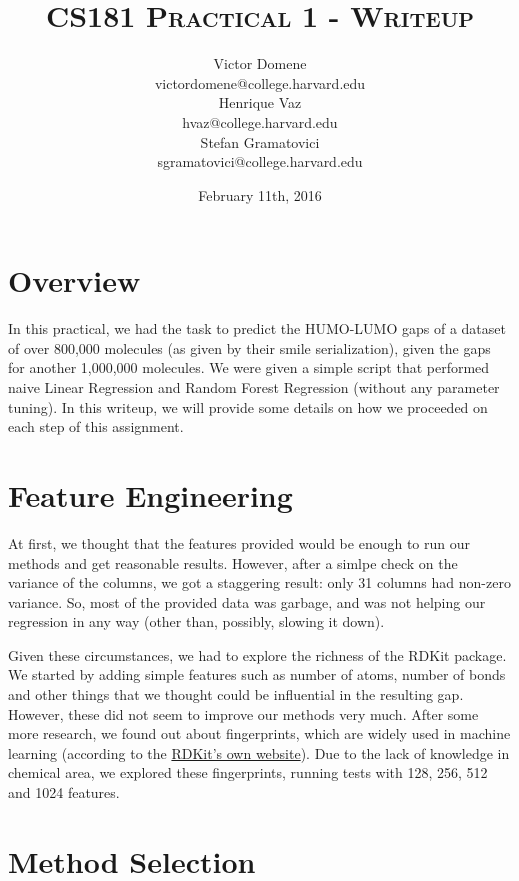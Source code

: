 \documentclass[10pt]{article}
\title{{\textsc{CS181 Practical 1 - Writeup}}}
\author{Victor Domene \\ \small{victordomene@college.harvard.edu} \\
Henrique Vaz \\ \small{hvaz@college.harvard.edu} \\
Stefan Gramatovici \\ \small{sgramatovici@college.harvard.edu}}
\date{February 11th, 2016}
\begin{document}
\hypersetup{linkcolor = black, urlcolor = blue}

\maketitle

\tableofcontents

\newpage

\section{Overview}

In this practical, we had the task to predict the HUMO-LUMO gaps of a dataset
of over 800,000 molecules (as given by their smile serialization), given the
gaps for another 1,000,000 molecules. We were given a simple script that
performed naive Linear Regression and Random Forest Regression (without any
parameter tuning). In this writeup, we will provide some details on how we proceeded on each step
of this assignment.

\section{Feature Engineering}

At first, we thought that the features provided would be enough to run our
methods and get reasonable results. However, after a simlpe check on the variance
of the columns, we got a staggering result: only 31 columns
had non-zero variance. So, most of the provided data was garbage, and was
not helping our regression in any way (other than, possibly, slowing it down).

\medskip

Given these circumstances, we had to explore the richness of the RDKit package.
We started by adding simple features such as number of atoms, number of bonds
and other things that we thought could be influential in the resulting gap.
However, these did not seem to improve our methods very much. After some more
research, we found out about fingerprints, which are widely used in machine
learning (according to the \href{http://www.rdkit.org/docs/Cookbook.html}{RDKit's own website}).
Due to the lack of knowledge in chemical area, we explored these fingerprints,
running tests with 128, 256, 512 and 1024 features.

\section{Method Selection}
\end{document}
